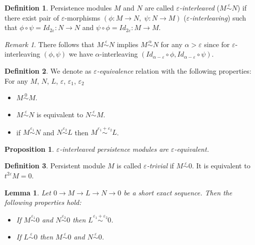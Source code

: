 \documentclass[a4paper, 12pt]{article}
\newtheorem{proposition}{Proposition}
\newtheorem{lemma}{Lemma}
\theoremstyle{definition}
\newtheorem{definition}{Definition}
\theoremstyle{remark}
\newtheorem{remark}{Remark}
\newcommand{\define}[1]{{\textit{#1}}}
\begin{document}
\begin{definition}
  Persistence modules $M$ and $N$ are called \define{$\varepsilon$-interleaved} ($M \stackrel{\varepsilon}{\sim} N$) if there exist pair of $\varepsilon$-morphisms $(\phi : M \to N,\;\psi : N \to M)$ (\define{$\varepsilon$-interleaving}) such that $\phi \circ \psi = Id_{2\varepsilon} : N \to N$ and $\psi \circ \phi = Id_{2\varepsilon} : M \to M$.
\end{definition}

\begin{remark}
There follows that $M \stackrel{\varepsilon}{\sim} N$ implies $M \stackrel{\alpha}{\sim} N$ for any $\alpha > \varepsilon$ since for $\varepsilon$-interleaving $(\phi, \psi)$ we have $\alpha$-interleaving $(Id_{\alpha - \varepsilon} \circ \phi, Id_{\alpha - \varepsilon} \circ \psi)$.
\end{remark}

\begin{definition}
  We denote as \define{$\varepsilon$-equivalence} relation with the following properties:\\
  For any $M$, $N$, $L$, $\varepsilon$, $\varepsilon_1$, $\varepsilon_2$
  \begin{itemize}
    \item $M \stackrel{0}{\sim} M$.
    \item $M \stackrel{\varepsilon}{\sim} N$ is equivalent to $N \stackrel{\varepsilon}{\sim} M$.
    \item if $M \stackrel{\varepsilon_1}{\sim} N$ and $N \stackrel{\varepsilon_2}{\sim} L$ then $M \stackrel{\varepsilon_1 + \varepsilon_2}{\sim} L$.
  \end{itemize}
\end{definition}

\begin{proposition}
  $\varepsilon$-interleaved persistence modules are $\varepsilon$-equivalent.
\end{proposition}

\begin{definition}
  Persistent module $M$ is called \define{$\varepsilon$-trivial} if $M \stackrel{\varepsilon}{\sim} 0$. It is equivalent to $t^{2\varepsilon}M = 0$.
\end{definition}

\begin{lemma}
  Let $0 \to M \to L \to N \to 0$ be a short exact sequence. Then the following properties hold:
  \begin{itemize}
    \item If $M \stackrel{\varepsilon_1}{\sim} 0$ and $N \stackrel{\varepsilon_2}{\sim} 0$ then $L \stackrel{\varepsilon_1 + \varepsilon_2}{\sim} 0$.
    \item If $L \stackrel{\varepsilon}{\sim} 0$ then $M \stackrel{\varepsilon}{\sim} 0$ and $N \stackrel{\varepsilon}{\sim} 0$.
  \end{itemize}
\end{lemma}
\end{document}
